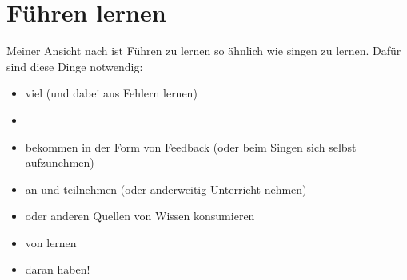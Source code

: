 \section{Führen lernen}
\label{fuehren-lernen}
\label{fuehrung-lernen}

Meiner Ansicht nach ist Führen zu lernen so ähnlich wie singen zu lernen. Dafür sind diese Dinge notwendig:

\begin{itemize}
  \item viel  (und dabei aus Fehlern lernen)
  \item {}
  \item {} bekommen in der Form von Feedback (oder beim Singen sich selbst aufzunehmen)
  \item an  und  teilnehmen (oder anderweitig Unterricht nehmen)
  \item {} oder anderen Quellen von Wissen konsumieren
  \item von  lernen
  \item {} daran haben!
\end{itemize}
